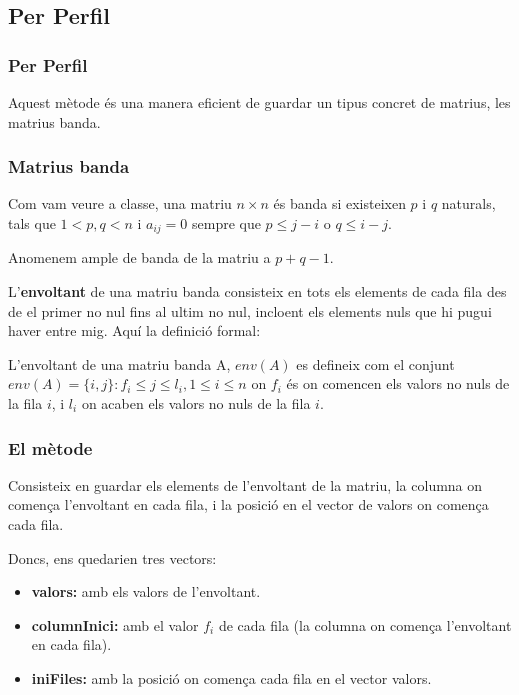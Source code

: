 \documentclass[8pt]{beamer}
\begin{document}
\subsection{Per Perfil}
\begin{frame}
  \frametitle{Per Perfil}
  Aquest mètode és una manera eficient de guardar un tipus concret de matrius, les matrius banda.

\end{frame}

\begin{frame}
  \frametitle{Matrius banda}
  Com vam veure a classe, 
una matriu $n \times n$ és banda si existeixen $p$ i $q$ naturals, tals que $1< p, q < n$  i $a_{i j} = 0$ sempre que $p \leq j - i$ o $q \leq i-j$. 

Anomenem ample de banda de la matriu a $p + q - 1$.

L'\textbf{envoltant} de una matriu banda consisteix en tots els elements de cada fila des de el primer no nul fins al ultim no nul, incloent els elements nuls que hi pugui haver entre mig.  Aquí la definició formal:

L'envoltant de una matriu banda A, $env(A)$ es defineix com el conjunt $env(A) = \{i, j\} : f_i \leq j \leq l_i, 1 \leq i \leq n $ on $f_i$ és on comencen els valors no nuls de la fila $i$, i $l_i$ on acaben els valors no nuls de la fila $i$.
\end{frame}


\begin{frame}
  \frametitle{El mètode}
  Consisteix en guardar els elements de l'envoltant de la matriu, la columna on comença l'envoltant en cada fila, i la posició en el vector de valors on comença cada fila.
 
Doncs, ens quedarien tres vectors:
\begin{itemize}
	\item \textbf{valors:} amb els valors de l'envoltant.
	\item \textbf{columnInici:} amb el valor $f_i$ de cada fila (la columna on comença l'envoltant en cada fila).
	\item \textbf{iniFiles:} amb la posició on comença cada fila en el vector valors.
\end{itemize}	
\end{frame}
\end{document}
